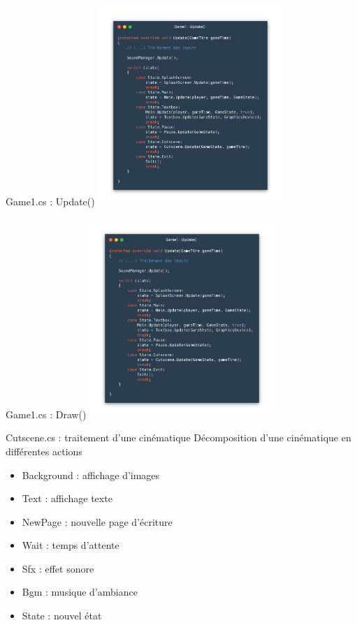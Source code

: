\documentclass{beamer}
\begin{document}
\begin{frame}{Game1.cs : Update()}
    \centering
    \includegraphics[width=7cm]{assets/game1update}
\end{frame}

\begin{frame}{Game1.cs : Draw()}
    \centering
    \includegraphics[width=7cm]{assets/game1update}
\end{frame}

\begin{frame}{Cutscene.cs : traitement d'une cinématique}
    Décomposition d'une cinématique en différentes actions
    
    \begin{itemize}
        \item Background : affichage d'images
        \item Text : affichage texte
        \item NewPage : nouvelle page d'écriture
        \item Wait : temps d'attente
        \item Sfx : effet sonore
        \item Bgm : musique d'ambiance
        \item State : nouvel état
    \end{itemize}
\end{frame}
\end{document}
